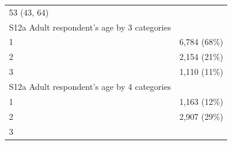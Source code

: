 \documentclass[]{article}
\begin{document}
\begin{longtable}[]{@{}ll@{}}
\begin{minipage}[t]{0.23\columnwidth}
53 (43, 64)\strut
\end{minipage}\tabularnewline
\begin{minipage}[t]{0.71\columnwidth}\raggedright
S12a Adult respondent's age by 3 categories\strut
\end{minipage} & \begin{minipage}[t]{0.23\columnwidth}\raggedright
\strut
\end{minipage}\tabularnewline
\begin{minipage}[t]{0.71\columnwidth}\raggedright
1\strut
\end{minipage} & \begin{minipage}[t]{0.23\columnwidth}\raggedright
6,784 (68\%)\strut
\end{minipage}\tabularnewline
\begin{minipage}[t]{0.71\columnwidth}\raggedright
2\strut
\end{minipage} & \begin{minipage}[t]{0.23\columnwidth}\raggedright
2,154 (21\%)\strut
\end{minipage}\tabularnewline
\begin{minipage}[t]{0.71\columnwidth}\raggedright
3\strut
\end{minipage} & \begin{minipage}[t]{0.23\columnwidth}\raggedright
1,110 (11\%)\strut
\end{minipage}\tabularnewline
\begin{minipage}[t]{0.71\columnwidth}\raggedright
S12a Adult respondent's age by 4 categories\strut
\end{minipage} & \begin{minipage}[t]{0.23\columnwidth}\raggedright
\strut
\end{minipage}\tabularnewline
\begin{minipage}[t]{0.71\columnwidth}\raggedright
1\strut
\end{minipage} & \begin{minipage}[t]{0.23\columnwidth}\raggedright
1,163 (12\%)\strut
\end{minipage}\tabularnewline
\begin{minipage}[t]{0.71\columnwidth}\raggedright
2\strut
\end{minipage} & \begin{minipage}[t]{0.23\columnwidth}\raggedright
2,907 (29\%)\strut
\end{minipage}\tabularnewline
\begin{minipage}[t]{0.71\columnwidth}\raggedright
3\strut
\end{minipage} & \begin{minipage}[t]{0.23\columnwidth}\raggedright

\end{minipage}
\end{longtable}
\end{document}

